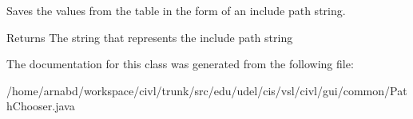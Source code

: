 Saves the values from the table in the form of an include path string. 

\begin{DoxyReturn}{Returns}
The string that represents the include path string 
\end{DoxyReturn}


The documentation for this class was generated from the following file\+:\begin{DoxyCompactItemize}
\item 
/home/arnabd/workspace/civl/trunk/src/edu/udel/cis/vsl/civl/gui/common/Path\+Chooser.\+java\end{DoxyCompactItemize}
